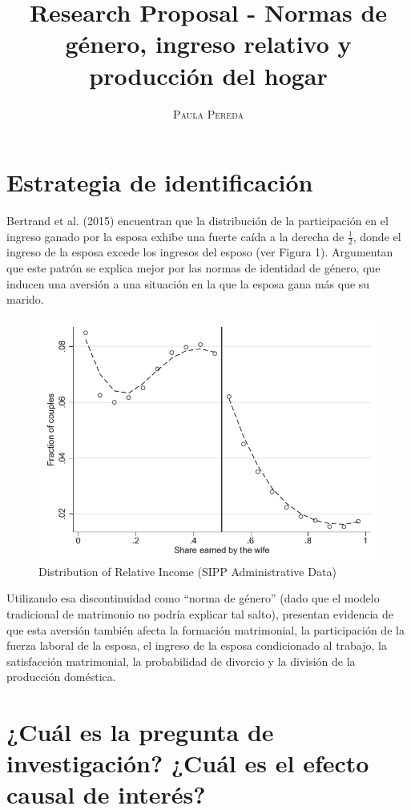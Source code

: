 \documentclass[15pt]{article}
\title{\vspace{-10mm}\fontsize{24pt}{12pt}\selectfont\textbf{Research Proposal - Normas de género, ingreso relativo y producción del hogar}} %
\author{
\large
{\textsc{Paula Pereda}}\\[2mm]
}
\date{}
\begin{document}
\renewcommand{\figurename}{Figura}
\renewcommand{\tablename}{Tabla}

\maketitle %
\thispagestyle{fancy} 

\section*{Estrategia de identificación}

Bertrand et al. (2015) encuentran que la distribución de la participación en el ingreso ganado por la esposa exhibe una fuerte caída a la derecha de $\frac{1}{2}$, donde el ingreso de la esposa excede los ingresos del esposo (ver Figura 1). Argumentan que este patrón se explica mejor por las normas de identidad de género, que inducen una aversión a una situación en la que la esposa gana más que su marido.

\begin{figure}[H]
   \caption{Distribution of Relative Income (SIPP Administrative Data)}
   \centering
   \includegraphics[width=0.7\linewidth]{images/bertrand_2015.png} 
\end{figure}

Utilizando esa discontinuidad como ``norma de género'' (dado que el modelo tradicional de matrimonio no podría explicar tal salto), 
presentan evidencia de que esta aversión también afecta la formación matrimonial, la participación de la fuerza laboral de la esposa, el ingreso de la esposa condicionado al trabajo, la satisfacción matrimonial, la probabilidad de divorcio y la división de la producción doméstica.

\section*{¿Cuál es la pregunta de investigación? ¿Cuál es el efecto causal de interés?}
\end{document}

